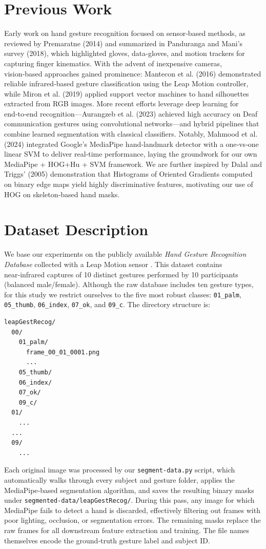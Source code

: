 \documentclass{article}
\begin{document}
\section{Previous Work}
Early work on hand gesture recognition focused on sensor‑based methods, as reviewed by Premaratne (2014) and summarized in Panduranga and Mani’s survey (2018), which highlighted gloves, data‑gloves, and motion trackers for capturing finger kinematics. With the advent of inexpensive cameras, vision‑based approaches gained prominence: Mantecon et al. (2016) demonstrated reliable infrared‑based gesture classification using the Leap Motion controller, while Miron et al. (2019) applied support vector machines to hand silhouettes extracted from RGB images. More recent efforts leverage deep learning for end‑to‑end recognition—Aurangzeb et al. (2023) achieved high accuracy on Deaf communication gestures using convolutional networks—and hybrid pipelines that combine learned segmentation with classical classifiers. Notably, Mahmood et al. (2024) integrated Google’s MediaPipe hand‑landmark detector with a one‑vs‑one linear SVM to deliver real‑time performance, laying the groundwork for our own MediaPipe + HOG+Hu + SVM framework. We are further inspired by Dalal and Triggs’ (2005) demonstration that Histograms of Oriented Gradients computed on binary edge maps yield highly discriminative features, motivating our use of HOG on skeleton‑based hand masks.

\section{Dataset Description}
We base our experiments on the publicly available \textit{Hand Gesture Recognition Database} collected with a Leap Motion sensor \cite{Mantecon2016}.  This dataset contains near‑infrared captures of 10 distinct gestures performed by 10 participants (balanced male/female).  Although the raw database includes ten gesture types, for this study we restrict ourselves to the five most robust classes: \texttt{01\_palm}, \texttt{05\_thumb}, \texttt{06\_index}, \texttt{07\_ok}, and \texttt{09\_c}.  The directory structure is:

\begin{verbatim}
leapGestRecog/
  00/
    01_palm/
      frame_00_01_0001.png
      ...
    05_thumb/
    06_index/
    07_ok/
    09_c/
  01/
    ...
  ...
  09/
    ...
\end{verbatim}

Each original image was processed by our \texttt{segment-data.py} script, which automatically walks through every subject and gesture folder, applies the MediaPipe‑based segmentation algorithm, and saves the resulting binary masks under \texttt{segmented-data/leapGestRecog/}.  During this pass, any image for which MediaPipe fails to detect a hand is discarded, effectively filtering out frames with poor lighting, occlusion, or segmentation errors.  The remaining masks replace the raw frames for all downstream feature extraction and training.  The file names themselves encode the ground‑truth gesture label and subject ID.
\end{document}
